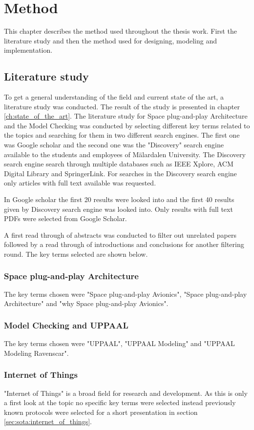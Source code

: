 \chapter{Method}\label{ch:method}
This chapter describes the method used throughout the thesis work. First
the literature study and then the method used for designing, modeling and
implementation.

\section{Literature study}
To get a general understanding of the field and current state of the art, a
literature study was conducted. The result of the study is presented in chapter
\ref{ch:state_of_the_art}. The literature study for Space plug-and-play
Architecture and the Model Checking was conducted by selecting different key
terms related to the topics and searching for them in two different search
engines. The first one was Google scholar and the second one was the
"Discovery" search engine available to the students and employees of
M\"{a}lardalen University. The Discovery search engine search through multiple
databases such as IEEE Xplore, ACM Digital Library and SpringerLink. For
searches in the Discovery search engine only articles with full text available
was requested.

In Google scholar the first 20 results were looked into and the first 40
results given by Discovery search engine was looked into. Only results with
full text PDFs were selected from Google Scholar.

A first read through of abstracts was conducted to filter out unrelated
papers followed by a read through of introductions and conclusions for
another filtering round. The key terms selected are shown below.

\subsection{Space plug-and-play Architecture}
The key terms chosen were "Space plug-and-play Avionics", "Space
plug-and-play Architecture" and "why Space plug-and-play Avionics".

\subsection{Model Checking and UPPAAL}
The key terms chosen were "UPPAAL", "UPPAAL Modeling" and "UPPAAL Modeling
Ravenscar".

\subsection{Internet of Things}
"Internet of Things" is a broad field for research and development. As this is
only a first look at the topic no specific key terms were selected instead
previously known protocols were selected for a short presentation in section
\ref{sec:sota:internet_of_things}.

